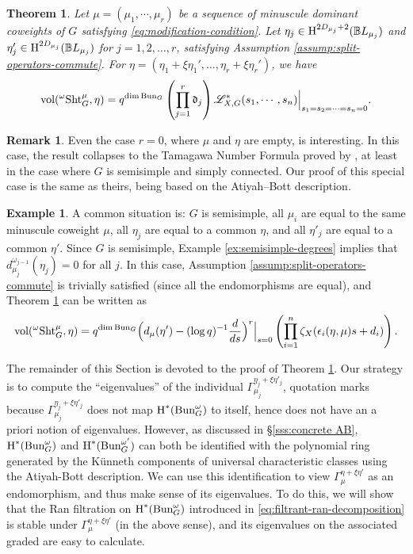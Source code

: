 \documentclass[reqno]{amsart}
\numberwithin{equation}{subsection}
\newtheorem{theorem}[subsubsection]{Theorem}
\theoremstyle{definition}
\newtheorem{remark}[subsubsection]{Remark}
\newtheorem{exam}[subsubsection]{Example}
\def\BB{\mathbb{B}}
\newcommand\frd{\mathfrak{d}}
\newcommand{\sL}{{\mathscr{L}}}
\newcommand{\Bun}{\textup{Bun}}
\newcommand\Sht{\textup{Sht}}
\newcommand{\vol}{\textup{vol}}
\newcommand{\cohog}[2]{\textup{H}^{#1}({#2})}     %
\newcommand\G\Gamma
\newcommand{\e}{\epsilon}
\newcommand{\y}{\eta}
\newcommand{\z}{\zeta}
\newcommand{\om}{\omega}
\begin{document}
\begin{theorem}\label{th:vol gen} Let $\mu=(\mu_{1},\cdots, \mu_{r})$ be a sequence of minuscule dominant coweights of $G$ satisfying \eqref{eq:modification-condition}. Let $\y_{j}\in \cohog{2D_{\mu_j}+2}{\BB L_{\mu_j}}$ and $\y'_{j}\in \cohog{2D_{\mu_j}}{\BB L_{\mu_j}}$ for $j=1, 2, \ldots, r$, satisfying Assumption \ref{assump:split-operators-commute}. For $\eta = (\eta_1+\xi \eta_1', \ldots, \eta_r+\xi \eta_r')$, we have 
\begin{equation}\label{eq:split-volume-formula}
\vol({}^{\omega}\Sht_G^\mu, \eta) = q^{\dim \Bun_{G}}\left(\prod_{j=1}^{r}\frd_{j}\right)\sL^{*}_{X,G}(s_{1},\cdots, s_{n})\Big|_{s_{1}=s_{2}=\cdots=s_{n}=0}.
\end{equation}
\end{theorem}

\begin{remark}
Even the case $r=0$, where $\mu$ and $\eta$ are empty, is interesting. In this case, the result collapses to the Tamagawa Number Formula proved by \cite{GL14}, at least in the case where $G$ is semisimple and simply connected. Our proof of this special case is the same as theirs, being based on the Atiyah--Bott description. 
\end{remark}


\begin{exam}
A common situation is: $G$ is semisimple, all $\mu_{i}$ are equal to the same minuscule coweight $\mu$, all $\y_{j}$ are equal to a common $\y$, and all $\y'_{j}$ are equal to a common $\y'$. Since $G$ is semisimple, Example \ref{ex:semisimple-degrees} implies that $d_{\mu_j}^{\omega_{j-1}}(\eta_j) = 0$ for all $j$. In this case, Assumption \ref{assump:split-operators-commute} is trivially satisfied (since all the endomorphisms are equal), and Theorem \ref{th:vol gen} can be written as
\begin{equation*}
\vol({}^\om\Sht_G^\mu, \eta)  =q^{\dim \Bun_{G}}
\Big(d_{\mu}(\y')-(\log q)^{-1}\frac{d}{ds}\Big)^r\Big|_{s=0}\left(\prod_{i=1}^{n}\z_{X}(\e_{i}(\y,\mu)s+d_{i})\right).
\end{equation*}
\end{exam}


The remainder of this Section is devoted to the proof of Theorem \ref{th:vol gen}. Our strategy is to compute the ``eigenvalues'' of the individual $\G_{\mu_j}^{\y_j+\xi\y'_j}$, quotation marks because $\G_{\mu_j}^{\y_j+\xi\y'_j}$ does not map $\cohog{*}{\Bun^{\om}_{G}}$ to itself, hence does not have an a priori notion of eigenvalues. However, as discussed in \S \ref{sss:concrete AB}, $\cohog{*}{\Bun^{\om}_{G}}$ and $\cohog{*}{\Bun^{\om'}_{G}}$ can both be identified with the polynomial ring generated by the K\"unneth components of universal characteristic classes using the Atiyah-Bott description.  We can use this identification to view $\G_{\mu}^{\y+\xi\y'}$ as an endomorphism, and thus make sense of its eigenvalues. To do this, we will show that the Ran filtration on $\cohog{*}{\Bun^{\om}_{G}}$ introduced in \eqref{eq:filtrant-ran-decomposition} is stable under $\G_{\mu}^{\y+\xi\y'}$ (in the above sense), and its eigenvalues on the associated graded are easy to calculate.
\end{document}
